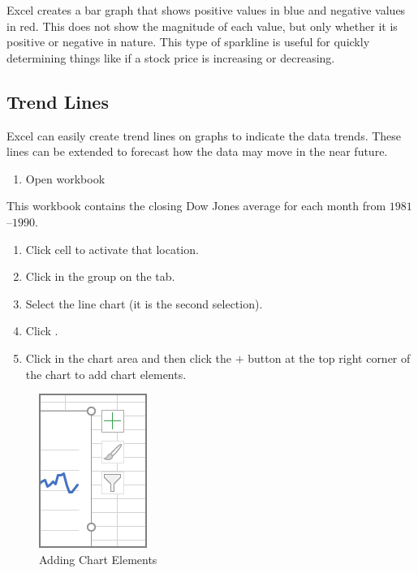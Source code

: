 Excel creates a bar graph that shows positive values in blue and negative values in red. This does not show the magnitude of each value, but only whether it is positive or negative in nature. This type of sparkline is useful for quickly determining things like if a stock price is increasing or decreasing.

\subsection{Trend Lines}

Excel can easily create trend lines on graphs to indicate the data trends. These lines can be extended to forecast how the data may move in the near future.

\begin{enumerate}
	\item Open workbook 
\end{enumerate}

This workbook contains the closing Dow Jones average for each month from $ 1981 $–$ 1990 $.

\begin{enumerate}[resume]
	\item Click cell  to activate that location.
	\item Click  in the  group on the  tab.
	\item Select the line chart (it is the second selection).
	\item Click .
	\item Click in the chart area and then click the $ + $ button at the top right corner of the chart to add chart elements.

\end{enumerate}

\begin{figure}[H]
	\centering
	\includegraphics[width=\maxwidth{.95\linewidth}]{gfx/ch08_fig07}
	\caption{Adding Chart Elements}
	\label{08:fig07}
\end{figure}

